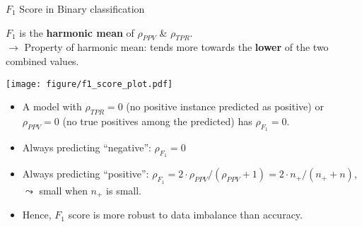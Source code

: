 \documentclass[11pt,compress,t,notes=noshow, xcolor=table]{beamer}
\newcommand{\np}{n_{+}} %
\begin{document}
\begin{vbframe}{$F_1$ Score in Binary classification}
	\footnotesize
	
	\begin{minipage}[c]{0.5\textwidth}
		\footnotesize
		$F_1$ is the \textbf{harmonic mean} of $\rho_{PPV}$ \& $\rho_{TPR}$. \\
		$\rightarrow$ Property of harmonic mean: tends more towards the \textbf{lower} of the two combined values.
	\end{minipage}%
	\begin{minipage}[c]{0.5\textwidth}
		\centering
		\texttt{[image: figure/f1\_score\_plot.pdf]}
	\end{minipage}
	
	\begin{itemize}
		\item A model with $\rho_{TPR} = 0$ (no positive instance predicted as 
		positive) or 
		$\rho_{PPV} = 0$ (no true positives among the predicted) has $\rho_{F_1} = 0$.
  
		\item Always predicting \enquote{negative}: $\rho_{F_1} = 0$
  
		\item Always predicting \enquote{positive}: $\rho_{F_1} = 2 \cdot \rho_{PPV} / 
		(\rho_{PPV} + 1) = 2 \cdot \np / (\np + n)$,\\ 
		$\leadsto$ small when $\np$ is small.

        \item Hence, $F_1$ score is more robust to data imbalance than accuracy.
  
	\end{itemize}
	
\end{vbframe}
\end{document}
